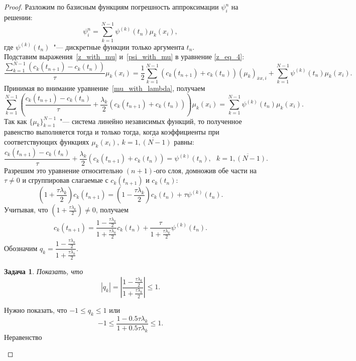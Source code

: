 \documentclass[11pt,a4paper,twoside,listtotoc,bibtotoc]{report}
\numberwithin{equation}{section}
\newtheorem*{problem}{Задача}
\theoremstyle{definition}
\theoremstyle{plain}
\begin{document}
\begin{proof}
Разложим по базисным функциям погрешность аппроксимации $\psi_i^n$ на решении:
%
\begin{equation}
%
    \label{psi_with_mu}
    \psi_i^n = \sum_{k=1}^{N-1} \psi^{(k)}(t_n) \mu_k(x_i),
%
\end{equation}
%
где $\psi^{(k)}(t_n)$~"--- дискретные функции только аргумента $t_n$.\\
Подставим выражения~\eqref{z_with_mu} и~\eqref{psi_with_mu} в уравнение
\eqref{z_eq_4}:
%
$$
    \frac{\sum_{k=1}^{N-1}(c_k(t_{n+1}) - c_k(t_n))}{\tau} \mu_k(x_i) =
    \frac12 \sum_{k=1}^{N-1} \left(c_k(t_{n+1}) + c_k(t_n)\right)(\mu_k)_{\overline{x}x, i} +
    \sum_{k=1}^{N-1} \psi^{(k)}(t_n)\mu_k(x_i).
$$
%
Принимая во внимание уравнение~\eqref{mu_with_lambda}, получаем
%
$$
    \sum_{k=1}^{N-1} \left(\frac{c_k(t_{n+1}) - c_k(t_n)}{\tau} +
    \frac{\lambda_k}{2} (c_k(t_{n+1}) + c_k(t_n))\right)\mu_k(x_i) =
    \sum_{k=1}^{N-1} \psi^{(k)}(t_n)\mu_k(x_i).
$$
%
Так как $\{\mu_k\}_{k=1}^{N-1}$~"--- система линейно независимых функций, то
полученное равенство выполняется тогда и только тогда, когда коэффициенты при
соответствующих функциях $\mu_k(x_i), ~k = \overline{1, (N-1)}$ равны:
%
$$
    \frac{c_k(t_{n+1}) - c_k(t_n)}{\tau} + \frac{\lambda_k}{2} (c_k(t_{n+1}) + c_k(t_n)) =
    \psi^{(k)}(t_n), ~~~k = \overline{1, (N-1)}.
$$
%
Разрешим это уравнение относительно $(n+1)$-ого слоя, домножив обе части на $\tau\neq0$
и сгруппировав слагаемые с $c_k(t_{n+1})$ и $c_k(t_n)$:
%
$$
    \left(1+\frac{\tau\lambda_k}{2}\right) c_k(t_{n+1}) =
    \left(1-\frac{\tau\lambda_k}{2}\right) c_k(t_n) + \tau\psi^{(k)}(t_n).
$$
%
Учитывая, что $\left(1 + \frac{\tau\lambda_k}{2}\right)\neq0$, получаем
%
\begin{equation}
%
    \label{ck_with_almost_q}
    c_k(t_{n+1}) = \frac{1-\frac{\tau\lambda_k}{2}}{1+\frac{\tau\lambda_k}{2}}
    c_k(t_n)+\frac{\tau}{1+\frac{\tau\lambda_k}{2}} \psi^{(k)}(t_n).
%
\end{equation}
%
Обозначим $q_k = \dfrac{1-\frac{\tau\lambda_k}{2}}{1+\frac{\tau\lambda_k}{2}}$.
%
\begin{problem}
%
    Показать, что
    $$
        |q_k| = \left|\dfrac{1 - \frac{\tau\lambda_k}{2}}
        {1 + \frac{\tau\lambda_k}{2}}\right| \leqslant 1.
    $$
%
\end{problem}
%
\begin{solution}
    Нужно показать, что $-1 \leqslant q_k \leqslant 1$ или
    $$
        -1 \leqslant \dfrac{1-0.5\tau\lambda_k}{1+0.5\tau\lambda_k} \leqslant 1.
    $$
    Неравенство

\end{solution}
\end{proof}
\end{document}

